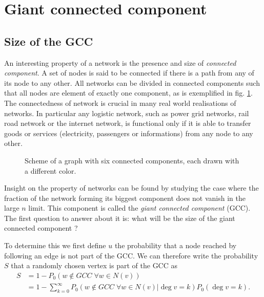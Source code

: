 \documentclass[
11pt, %
english, %
singlespacing, %
nolistspacing, %
liststotoc, %
headsepline, %
]{MastersDoctoralThesis} %
\begin{document}
\section{Giant connected component}
\label{Section: Giant connected component}

\subsection{Size of the GCC}

An interesting property of a network is the presence and size of \emph{connected component}. A set of nodes is said to be connected if there is a path from any of its node to any other. All networks can be divided in connected components such that all nodes are element of exactly one component, as is exemplified in fig. \ref{Figure: Connected components}. The connectedness of network is crucial in many real world realisations of networks. In particular any logistic network, such as power grid networks, rail road network or the internet network, is functional only if it is able to transfer goods or services (electricity, passengers or informations) from any node to any other.

\begin{figure}
	
	\caption{Scheme of a graph with six connected components, each drawn with a different color.}
	\label{Figure: Connected components}
\end{figure}

Insight on the property of networks can be found by studying the case where the fraction of the network forming its biggest component does not vanish in the large $n$ limit. This component is called the \emph{giant connected component} (GCC). The first question to answer about it is: what will be the size of the giant connected component ?

To determine this we first define $u$ the probability that a node reached by following an edge is not part of the GCC. We can therefore write the probability $S$ that a randomly chosen vertex is part of the GCC as
\begin{align}
	S 	&= 1 - P_0(w \notin GCC\; \forall w \in N(v))\\
		&= 1 - \sum_{k=0}^\infty P_0(w \notin GCC\; \forall w \in N(v)|\deg{v} = k) P_0(\deg{v} = k).
\end{align}
\end{document}
